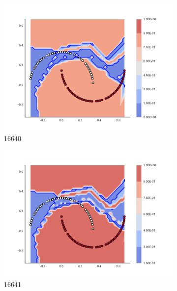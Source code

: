 \begin{figure}[h]
\begin{subfigure}[b]{0.09\textwidth}
    \includegraphics[clip, trim=2.35cm 1.75cm 4.5cm 0cm,width=\textwidth]{img/convergence/16640.pdf}
    \caption{16640}
    \label{fig:convergence_16640}
\end{subfigure}
%
\begin{subfigure}[b]{0.09\textwidth}
    \includegraphics[clip, trim=2.35cm 1.75cm 4.5cm 0cm,width=\textwidth]{img/convergence/16641.pdf}
    \caption{16641}
    \label{fig:convergence_16641}
\end{subfigure}
%
\begin{subfigure}[b]{0.09\textwidth}

\end{subfigure}
\end{figure}
